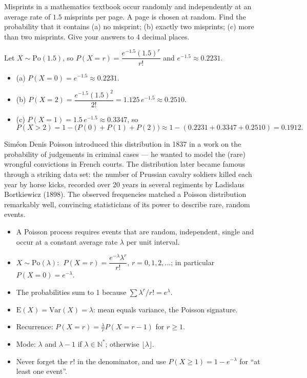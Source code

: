 \documentclass[11pt]{article}
\newcommand{\cle}[1]{{\popxbold\color{popdark}#1}}
\begin{document}
\begin{exercice}
Misprints in a mathematics textbook occur randomly and independently at an average rate of $1.5$ misprints per page. A page is chosen at random. Find the probability that it contains (a) no misprint; (b) exactly two misprints; (c) more than two misprints. Give your answers to 4 decimal places.
\end{exercice}

\begin{corrige}[Exercise 1]
Let $X \sim \mathrm{Po}(1.5)$, so $P(X = r) = \dfrac{e^{-1.5}(1.5)^{r}}{r!}$ and $e^{-1.5} \approx 0.2231$.
\begin{itemize}
\item (a) $P(X = 0) = e^{-1.5} \approx 0.2231$.
\item (b) $P(X = 2) = \dfrac{e^{-1.5}(1.5)^{2}}{2!} = 1.125\,e^{-1.5} \approx 0.2510$.
\item (c) $P(X = 1) = 1.5\,e^{-1.5} \approx 0.3347$, so
\[ P(X > 2) = 1 - \bigl(P(0) + P(1) + P(2)\bigr) \approx 1 - (0.2231 + 0.3347 + 0.2510) = 0.1912. \]
\end{itemize}
\end{corrige}

\begin{savaistu}
Siméon Denis Poisson introduced this distribution in 1837 in a work on the probability of judgements in criminal cases --- he wanted to model the (rare) wrongful convictions in French courts. The distribution later became famous through a striking data set: the number of Prussian cavalry soldiers killed each year by horse kicks, recorded over 20 years in several regiments by Ladislaus Bortkiewicz (1898). The observed frequencies matched a Poisson distribution remarkably well, convincing statisticians of its power to describe rare, random events.
\end{savaistu}

\begin{aretenir}
\begin{itemize}
\item A Poisson process requires events that are \cle{random}, \cle{independent}, \cle{single} and occur at a \cle{constant average rate} $\lambda$ per \cle{unit interval}.
\item $X \sim \mathrm{Po}(\lambda)$: $\;P(X = r) = \dfrac{e^{-\lambda}\lambda^{r}}{r!}$, $r = 0, 1, 2, \dots$; in particular $P(X = 0) = e^{-\lambda}$.
\item The probabilities sum to 1 because $\sum \lambda^{r}/r! = e^{\lambda}$.
\item $\mathrm{E}(X) = \mathrm{Var}(X) = \lambda$: mean equals variance, the Poisson signature.
\item Recurrence: $P(X = r) = \frac{\lambda}{r} P(X = r-1)$ for $r \ge 1$.
\item Mode: $\lambda$ and $\lambda-1$ if $\lambda \in \mathbb{N}^*$; otherwise $\lfloor \lambda \rfloor$.
\item Never forget the $r!$ in the denominator, and use $P(X \geq 1) = 1 - e^{-\lambda}$ for ``at least one event''.
\end{itemize}
\end{aretenir}
\end{document}
